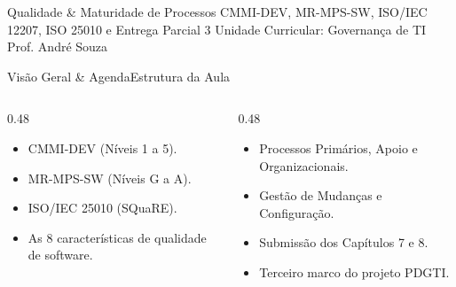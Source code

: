 
\senaicover
  {Qualidade \& Maturidade de Processos}
  {CMMI-DEV, MR-MPS-SW, ISO/IEC 12207, ISO 25010 e Entrega Parcial 3}
  {Unidade Curricular: Governança de TI}
  {Prof. André Souza}

\begin{senaiframe}{Visão Geral \& Agenda}{Estrutura da Aula}
  \begin{columns}[t]
    \begin{column}{0.48\textwidth}
      \begin{tcolorbox}[senaibluecard, title={1. Modelos de Maturidade}]
        \begin{itemize}
          \item CMMI-DEV (Níveis 1 a 5).
          \item MR-MPS-SW (Níveis G a A).
        \end{itemize}
      \end{tcolorbox}
      \vspace{4pt}
      \begin{tcolorbox}[senaiambercard, title={3. Qualidade de Produto}]
        \begin{itemize}
          \item ISO/IEC 25010 (SQuaRE).
          \item As 8 características de qualidade de software.
        \end{itemize}
      \end{tcolorbox}
    \end{column}
    \begin{column}{0.48\textwidth}
      \begin{tcolorbox}[senairedcard, title={2. Ciclo de Vida (ISO 12207)}]
        \begin{itemize}
          \item Processos Primários, Apoio e Organizacionais.
          \item Gestão de Mudanças e Configuração.
        \end{itemize}
      \end{tcolorbox}
      \vspace{4pt}
      \begin{tcolorbox}[senaigreencard, title={4. Entrega Parcial 3}]
        \begin{itemize}
          \item Submissão dos Capítulos 7 e 8.
          \item Terceiro marco do projeto PDGTI.
        \end{itemize}
      \end{tcolorbox}
    \end{column}
  \end{columns}
\end{senaiframe}

